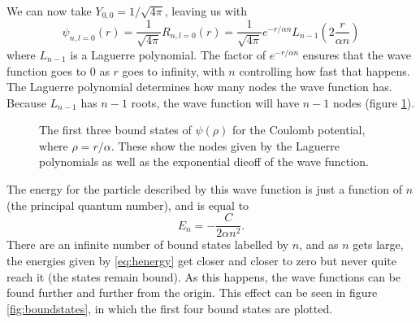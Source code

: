 \documentclass[12pt,twoside]{reedthesis}
\newcommand{\eqn}[1]{\begin{equation}#1\end{equation}}
\begin{document}
We can now take $Y_{0,0} = 1/\sqrt{4 \pi}$, leaving us with
\eqn{
\psi_{n, l =0}(r) = \frac{1}{\sqrt{4\pi}}R_{n , l= 0}(r) = \frac{1}{\sqrt{4\pi}} e^{-r /\alpha n}L_{n-1} \left(2\frac{r}{ \alpha n}\right)
\label{eq:SWE-coulomb}
}
where $L_{n-1}$ is a Laguerre polynomial. The factor of $e^{-r /\alpha n}$ ensures that the wave function goes to 0 as $r$ goes to infinity, with $n$ controlling how fast that happens. The Laguerre polynomial determines how many nodes the wave function has. Because $L_{n-1}$ has $n-1$ roots, the wave function will have $n-1$ nodes (figure \ref{fig:wavefunctions}).
\begin{figure}[h]
\centering
{}
\caption[The first three bound states of $\psi(\rho)$ for the Coulomb potential]{The first three bound states of $\psi(\rho)$ for the Coulomb potential, where $\rho = r/\alpha$. These show the nodes given by the Laguerre polynomials as well as the exponential dieoff of the wave function.}
\label{fig:wavefunctions}
\end{figure}

The energy for the particle described by this wave function is just a function of $n$ (the principal quantum number), and is equal to
\eqn{
E_n = -\frac{C}{2\alpha n^2}\mbox{.}
\label{eq:henergy}
}
There are an infinite number of bound states labelled by $n$, and as $n$ gets large, the energies given by \eqref{eq:henergy} get closer and closer to zero but never quite reach it (the states remain bound). As this happens, the wave functions can be found further and further from the origin. This effect can be seen in figure \ref{fig:boundstates}, in which the first four bound states are plotted.
\end{document}
